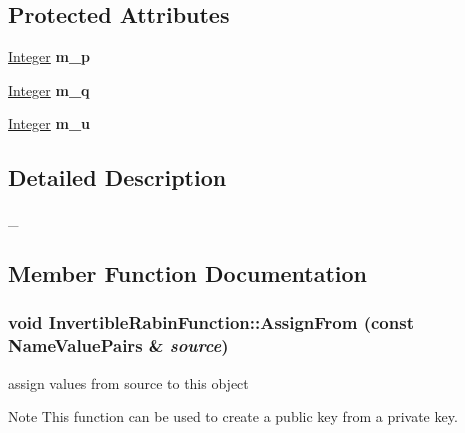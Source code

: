 \subsection*{Protected Attributes}
\begin{DoxyCompactItemize}
\item 
\hypertarget{class_invertible_rabin_function_a7265f1577c7c60962100bf048c532b65}{
\hyperlink{class_integer}{Integer} {\bfseries m\_\-p}}
\label{class_invertible_rabin_function_a7265f1577c7c60962100bf048c532b65}

\item 
\hypertarget{class_invertible_rabin_function_a6f7f68cf7b9299b85da9df3241aa8096}{
\hyperlink{class_integer}{Integer} {\bfseries m\_\-q}}
\label{class_invertible_rabin_function_a6f7f68cf7b9299b85da9df3241aa8096}

\item 
\hypertarget{class_invertible_rabin_function_a39d937e65da2073ea867b8a93f8b25e7}{
\hyperlink{class_integer}{Integer} {\bfseries m\_\-u}}
\label{class_invertible_rabin_function_a39d937e65da2073ea867b8a93f8b25e7}

\end{DoxyCompactItemize}


\subsection{Detailed Description}
\_\- 

\subsection{Member Function Documentation}
\hypertarget{class_invertible_rabin_function_a66594bb7f369e4ecc30bbe6ae62527ea}{
\subsubsection[{AssignFrom}]{\setlength{\rightskip}{0pt plus 5cm}void InvertibleRabinFunction::AssignFrom (const {\bf NameValuePairs} \& {\em source})}}
\label{class_invertible_rabin_function_a66594bb7f369e4ecc30bbe6ae62527ea}


assign values from source to this object \begin{DoxyNote}{Note}
This function can be used to create a public key from a private key. 
\end{DoxyNote}



